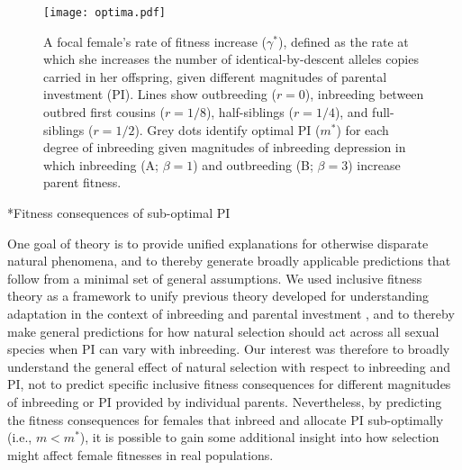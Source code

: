 \documentclass[12pt]{article}
\makeatletter
\renewcommand\section{\@startsection{section}{1}{0in}{-0.5\baselineskip}{0.1\baselineskip}{\normalfont\large\bfseries}}
\makeatother
\begin{document}
\begin{figure}[H]
\begin{center}				
\texttt{[image: optima.pdf]}
\end{center}
\caption{A focal female's rate of fitness increase ($\gamma^{*}$), defined as the rate at which she increases the number of identical-by-descent alleles copies carried in her offspring, given different magnitudes of parental investment (PI). Lines show outbreeding ($r=0$), inbreeding between outbred first cousins ($r=1/8$), half-siblings ($r=1/4$), and full-siblings ($r=1/2$). Grey dots identify optimal PI ($m^{*}$) for each degree of inbreeding given magnitudes of inbreeding depression in which inbreeding (A; $\beta=1$) and outbreeding (B; $\beta=3$) increase parent fitness.}
\label{optima}
\end{figure}

\clearpage

\section*{Fitness consequences of sub-optimal PI}


\noindent One goal of theory is to provide unified explanations for otherwise disparate natural phenomena, and to thereby generate broadly applicable predictions that follow from a minimal set of general assumptions. We used inclusive fitness theory as a framework to unify previous theory developed for understanding adaptation in the context of inbreeding \cite[][]{Parker1979, Parker2006} and parental investment \cite[e.g.,][]{Macnair1978, Parker1978}, and to thereby make general predictions for how natural selection should act across all sexual species when PI can vary with inbreeding. Our interest was therefore to broadly understand the general effect of natural selection with respect to inbreeding and PI, not to predict specific inclusive fitness consequences for different magnitudes of inbreeding or PI provided by individual parents. Nevertheless, by predicting the fitness consequences for females that inbreed and allocate PI sub-optimally (i.e., $m < m^{*}$), it is possible to gain some additional insight into how selection might affect female fitnesses in real populations. 
\end{document}

